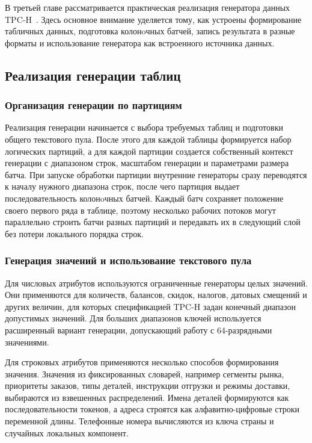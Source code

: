В третьей главе рассматривается практическая реализация генератора данных
TPC-H~\cite{schengen-repo}. Здесь основное внимание уделяется тому,
как устроены формирование табличных данных, подготовка колонoчных батчей,
запись результата в разные форматы и использование генератора как встроенного
источника данных.

\subsection{Реализация генерации таблиц}

\subsubsection{Организация генерации по партициям}

Реализация генерации начинается с выбора требуемых таблиц и подготовки общего
текстового пула. После этого для каждой таблицы формируется набор логических
партиций, а для каждой партиции создается собственный контекст генерации с
диапазоном строк, масштабом генерации и параметрами размера батча.
При запуске обработки партиции внутренние генераторы сразу переводятся к
началу нужного диапазона строк, после чего партиция выдает последовательность
колонoчных батчей. Каждый батч сохраняет положение своего первого ряда в
таблице, поэтому несколько рабочих потоков могут параллельно строить батчи
разных партиций и передавать их в следующий слой без потери локального порядка
строк.

\subsubsection{Генерация значений и использование текстового пула}

Для числовых атрибутов используются ограниченные генераторы целых значений.
Они применяются для количеств, балансов, скидок, налогов, датовых смещений и
других величин, для которых спецификацией TPC-H задан конечный
диапазон допустимых значений. Для больших диапазонов ключей используется
расширенный вариант генерации, допускающий работу с 64-разрядными значениями.

Для строковых атрибутов применяются несколько способов формирования значения.
Значения из фиксированных словарей, например сегменты рынка, приоритеты
заказов, типы деталей, инструкции отгрузки и режимы доставки, выбираются из
взвешенных распределений. Имена деталей формируются как последовательности
токенов, а адреса строятся как алфавитно-цифровые строки переменной длины.
Телефонные номера вычисляются из ключа страны и случайных локальных компонент.


